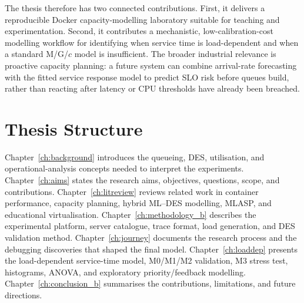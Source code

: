 The thesis therefore has two connected contributions. First, it delivers a reproducible Docker capacity-modelling laboratory suitable for teaching and experimentation. Second, it contributes a mechanistic, low-calibration-cost modelling workflow for identifying when service time is load-dependent and when a standard M/G/$c$ model is insufficient. The broader industrial relevance is proactive capacity planning: a future system can combine arrival-rate forecasting with the fitted service response model to predict SLO risk before queues build, rather than reacting after latency or CPU thresholds have already been breached.

\section{Thesis Structure}

Chapter~\ref{ch:background} introduces the queueing, DES, utilisation, and operational-analysis concepts needed to interpret the experiments. Chapter~\ref{ch:aims} states the research aims, objectives, questions, scope, and contributions. Chapter~\ref{ch:litreview} reviews related work in container performance, capacity planning, hybrid ML--DES modelling, MLASP, and educational virtualisation. Chapter~\ref{ch:methodology_b} describes the experimental platform, server catalogue, trace format, load generation, and DES validation method. Chapter~\ref{ch:journey} documents the research process and the debugging discoveries that shaped the final model. Chapter~\ref{ch:loaddep} presents the load-dependent service-time model, M0/M1/M2 validation, M3 stress test, histograms, ANOVA, and exploratory priority/feedback modelling. Chapter~\ref{ch:conclusion_b} summarises the contributions, limitations, and future directions.
